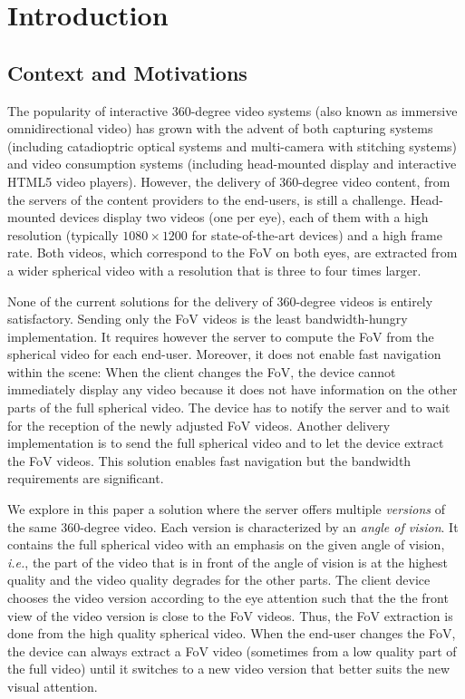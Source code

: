 \section{Introduction}
\label{sec:introduction}

\subsection{Context and Motivations}

The popularity of interactive 360-degree video systems (also known as immersive omnidirectional video) 
has grown with the advent of both capturing systems
(including catadioptric optical systems and multi-camera with stitching systems) and video
consumption systems (including head-mounted display and interactive HTML5 video players).
However, the delivery of 360-degree video content, from the servers of the content providers
to the end-users,
is still a challenge. Head-mounted devices display two videos (one per
eye), each of them with a high resolution (typically $1080\times 1200$ for state-of-the-art devices)
and a high frame rate. Both videos, which correspond to the \ac{FoV} on both eyes, are extracted
from a wider spherical video with a resolution that is three to four times larger.

None of the current solutions for the delivery of 360-degree videos is entirely satisfactory. Sending only 
the \ac{FoV} videos is the least bandwidth-hungry implementation. It requires however the server to 
compute the \ac{FoV} from the spherical video for each end-user. Moreover, it does not enable fast
navigation within the scene: When the client changes the 
\ac{FoV}, the device cannot immediately display any video because it does not have information on the other
parts of the full spherical video. The device has to notify the server and to wait for the reception of the 
newly adjusted \ac{FoV} videos. Another delivery implementation is to send the full spherical video 
and to let the device
extract the \ac{FoV} videos. This solution enables fast navigation but the bandwidth requirements are 
significant.

We explore in this paper a solution where the server offers multiple \emph{versions} of the same 
360-degree  video. Each version is characterized by an \emph{angle of vision}. It contains the full spherical 
video with an emphasis on the given angle of vision, \textit{i.e.},
the part of the video that is in front of the angle of vision is at the highest quality and the video quality 
degrades for the other parts. The client device chooses the video version according to the eye attention 
such that the 
the front view of the video version is close to the \ac{FoV} videos. Thus, the \ac{FoV} extraction is done
from the high quality spherical video. When the end-user changes the 
\ac{FoV}, the device can always extract a \ac{FoV} video (sometimes from a low quality part of the 
full video) until it switches to a new video version that better suits the new visual attention.

